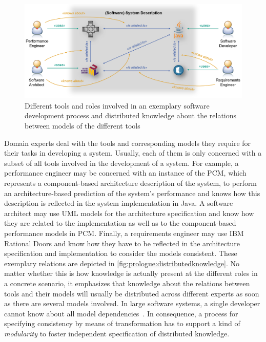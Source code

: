 \begin{figure}
    \centering
    \includegraphics[width=\textwidth]{figures/prologue/distributed_knowledge.png}
    \caption[Tools and distributed knowledge in engineering processes]{Different tools and roles involved in an exemplary software development process and distributed knowledge about the relations between models of the different tools}
    \label{fig:prologue:distributedknowledge}
\end{figure}

Domain experts deal with the tools and corresponding models they require for their tasks in developing a system.
Usually, each of them is only concerned with a subset of all tools involved in the development of a system.
For example, a performance engineer may be concerned with an instance of the \gls{PCM}, which represents a component-based architecture description of the system, to perform an architecture-based prediction of the system's performance and knows how this description is reflected in the system implementation in Java.
A software architect may use \gls{UML} models for the architecture specification and know how they are related to the implementation as well as to the component-based performance models in \gls{PCM}.
Finally, a requirements engineer may use IBM Rational Doors and know how they have to be reflected in the architecture specification and implementation to consider the models consistent.
These exemplary relations are depicted in \autoref{fig:prologue:distributedknowledge}.
No matter whether this is how knowledge is actually present at the different roles in a concrete scenario, it emphasizes that knowledge about the relations between tools and their models will usually be distributed across different experts as soon as there are several models involved.
In large software systems, a single developer cannot know about all model dependencies~\cite{petrenko2008a}.
In consequence, a process for specifying consistency by means of transformation has to support a kind of \emph{modularity} to foster independent specification of distributed knowledge.

